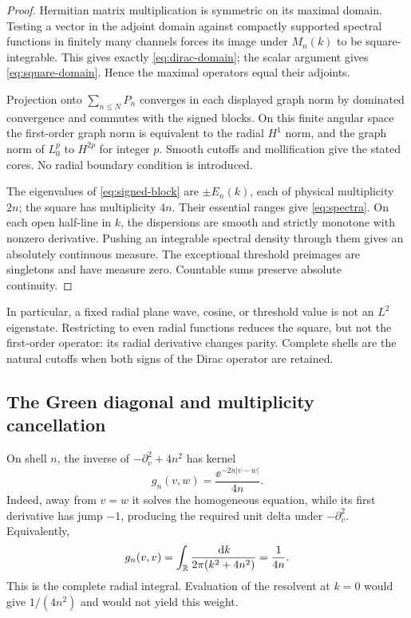 \begin{proof}
Hermitian matrix multiplication is symmetric on its maximal domain.
Testing a vector in the adjoint domain against compactly supported
spectral functions in finitely many channels forces its image under
$M_n(k)$ to be square-integrable. This gives exactly
\eqref{eq:dirac-domain}; the scalar argument gives
\eqref{eq:square-domain}. Hence the maximal operators equal their
adjoints.

Projection onto $\sum_{n\le N}P_n$ converges in each displayed graph norm
by dominated convergence and commutes with the signed blocks. On this
finite angular space the first-order graph norm is equivalent to the
radial $H^1$ norm, and the graph norm of $L_0^p$ to $H^{2p}$ for integer
$p$. Smooth cutoffs and mollification give the stated cores. No radial
boundary condition is introduced.

The eigenvalues of \eqref{eq:signed-block} are $\pm E_n(k)$, each of
physical multiplicity $2n$; the square has multiplicity $4n$. Their
essential ranges give \eqref{eq:spectra}. On each open half-line in $k$,
the dispersions are smooth and strictly monotone with nonzero derivative.
Pushing an integrable spectral density through them gives an absolutely
continuous measure. The exceptional threshold preimages are singletons
and have measure zero. Countable sums preserve absolute continuity.
\end{proof}

In particular, a fixed radial plane wave, cosine, or threshold value is
not an $L^2$ eigenstate. Restricting to even radial functions reduces the
square, but not the first-order operator: its radial derivative changes
parity. Complete shells are the natural cutoffs when both signs of the
Dirac operator are retained.

\subsection{The Green diagonal and multiplicity cancellation}

On shell $n$, the inverse of $-\partial_v^2+4n^2$ has kernel
\begin{equation}
 g_n(v,w)=\frac{\ee^{-2n|v-w|}}{4n}.
 \label{eq:green-kernel}
\end{equation}
Indeed, away from $v=w$ it solves the homogeneous equation, while its
first derivative has jump $-1$, producing the required unit delta
under $-\partial_v^2$. Equivalently,
\begin{equation}
 g_n(v,v)=\int_\mathbb R\frac{\,\mathrm d k}{2\pi(k^2+4n^2)}=\frac1{4n}.
 \label{eq:green-diagonal}
\end{equation}
This is the complete radial integral. Evaluation of the resolvent at
$k=0$ would give $1/(4n^2)$ and would not yield this weight.

